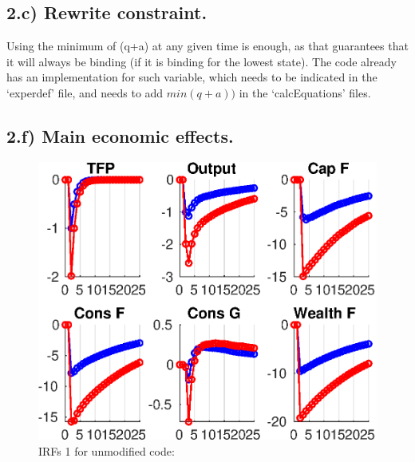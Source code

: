 \documentclass{article}
\begin{document}
\subsection*{2.c) Rewrite constraint.}

Using the minimum of (q+a) at any given time is enough, as that guarantees that it will always be binding (if it is binding for the lowest state). The code already has an implementation for such variable, which needs to be indicated in the `experdef' file, and needs to add $min(q+a))$ in the `calcEquations' files.






\subsection*{2.f) Main economic effects.}







\begin{figure}
\caption{IRFs 1 for unmodified code:}
\includegraphics [width=5in]{PS03_projection_code_modif/Results/GR_orig_diff_IRF1.eps}
\end{figure}
\end{document}
